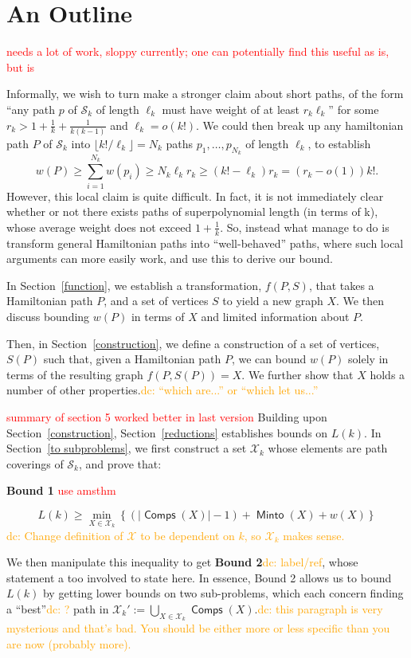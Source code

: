 \documentclass{article}
\theoremstyle{definition}
\DeclareMathOperator{\Minto}{\bm{\mathsf{Minto}}}
\DeclareMathOperator{\Comp}{\bm{\mathsf{Comps}}}
\newcommand{\edit}[1]{\textcolor{red}{#1}}
\newcommand{\dc}[1]{\textcolor{orange}{dc: #1}}
\begin{document}
\section{An Outline}\edit{ needs a lot of work, sloppy currently; one can potentially find this useful as is, but is}

Informally, we wish to turn make a stronger claim about short paths, of the form ``any path $p$ of $\mathcal{S}_k$ of length $\ell_k$ must have weight of at least $r_k\ell_k$'' for some $r_k > 1 + \frac{1}{k} + \frac{1}{k(k-1)}$ and $\ell_k =o(k!)$. We could then break up any hamiltonian path $P$ of $\mathcal{S}_k$ into $\lfloor k!/\ell_k \rfloor = N_k$ paths $p_1,\dots, p_{N_k}$ of length $\ell_k$, to establish \[w(P) \ge \sum_{i=1}^{N_k} w(p_i) \ge N_k\ell_kr_k \ge (k!-\ell_k)r_k = (r_k-o(1))k! .\]However, this local claim is quite difficult. In fact, it is not immediately clear whether or not there exists paths of superpolynomial length (in terms of k), whose average weight does not exceed $1+\frac{1}{k}$. So, instead what manage to do is transform general Hamiltonian paths into ``well-behaved'' paths, where such local arguments can more easily work, and use this to derive our bound. 

In Section~\ref{function}, we establish a transformation, $f(P,S)$, that takes a Hamiltonian path $P$, and a set of vertices $S$ to yield a new graph $X$. We then discuss bounding $w(P)$ in terms of $X$ and limited information about $P$.

Then, in Section~\ref{construction}, we define a construction of a set of vertices, $S(P)$ such that, given a Hamiltonian path $P$, we can bound $w(P)$ solely in terms of the resulting graph $f(P,S(P)) = X$. We further show that $X$ holds a number of other properties.\dc{ ``which are...'' or ``which let us...''}

\edit{summary of section 5 worked better in last version} Building upon Section~\ref{construction}, Section~\ref{reductions} establishes bounds on $L(k)$. In Section~\ref{to subproblems}, we first construct a set $\mathcal{X}_k$ whose elements are path coverings of $\mathcal{S}_k$, and prove that:

\textbf{Bound 1}\edit{ use amsthm}

\[ L(k) \geq \min_{X \in \mathcal{X}_k}\left\{(|\Comp(X)|-1) + \Minto(X) + w(X)\right\} \]
\dc{Change definition of $\mathcal{X}$ to be dependent on $k$, so $\mathcal{X}_k$ makes sense.}

We then manipulate this inequality to get \textbf{Bound 2}\dc{ label/ref}, whose statement a too involved to state here. In essence, Bound 2 allows us to bound $L(k)$ by getting lower bounds on two sub-problems, which each concern finding a ``best''\dc{ ?} path in $\mathcal{X}_k':=\bigcup_{X \in \mathcal{X}_k} \Comp(X)$.\dc{ this paragraph is very mysterious and that's bad. You should be either more or less specific than you are now (probably more).}
\end{document}
